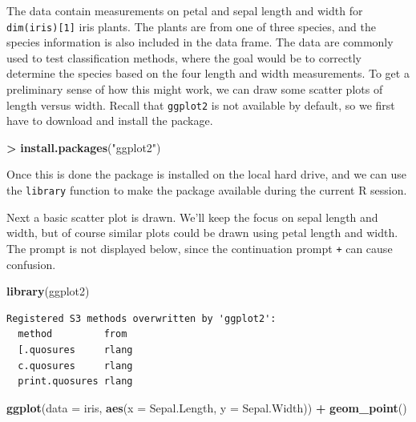 \documentclass[]{krantz}
\makeatletter
\newenvironment{Shaded}{\begin{snugshade}}{\end{snugshade}}
\newcommand{\DataTypeTok}[1]{\textcolor[rgb]{0.27,0.27,0.27}{#1}}
\newcommand{\KeywordTok}[1]{\textcolor[rgb]{0.27,0.27,0.27}{\textbf{#1}}}
\newcommand{\NormalTok}[1]{#1}
\newcommand{\OperatorTok}[1]{\textcolor[rgb]{0.43,0.43,0.43}{\textbf{#1}}}
\newcommand{\StringTok}[1]{\textcolor[rgb]{0.5,0.5,0.5}{#1}}
\newenvironment{kframe}{%
\medskip{}
\setlength{\fboxsep}{.8em}
 \def\at@end@of@kframe{}%
 \ifinner\ifhmode%
  \def\at@end@of@kframe{\end{minipage}}%
  \begin{minipage}{\columnwidth}%
 \fi\fi%
 \def\FrameCommand##1{\hskip\@totalleftmargin \hskip-\fboxsep
 \colorbox{shadecolor}{##1}\hskip-\fboxsep
     \hskip-\linewidth \hskip-\@totalleftmargin \hskip\columnwidth}%
 \MakeFramed {\advance\hsize-\width
   \@totalleftmargin\z@ \linewidth\hsize
   \@setminipage}}%
 {\par\unskip\endMakeFramed%
 \at@end@of@kframe}
\renewenvironment{Shaded}{\begin{kframe}}{\end{kframe}}
\makeatother
\begin{document}
The data contain measurements on petal and sepal length and width for \texttt{dim(iris){[}1{]}} iris plants. The plants are from one of three species, and the species information is also included in the data frame. The data are commonly used to test classification methods, where the goal would be to correctly determine the species based on the four length and width measurements. To get a preliminary sense of how this might work, we can draw some scatter plots of length versus width. Recall that \texttt{ggplot2} is not available by default, so we first have to download and install the package.

\begin{Shaded}
\begin{Highlighting}[]
\OperatorTok{>}\StringTok{ }\KeywordTok{install.packages}\NormalTok{(}\StringTok{"ggplot2"}\NormalTok{)}
\end{Highlighting}
\end{Shaded}

Once this is done the package is installed on the local hard drive, and we can use the \texttt{library} function to make the package available during the current R session.

Next a basic scatter plot is drawn. We'll keep the focus on sepal length and width, but of course similar plots could be drawn using petal length and width. The prompt is not displayed below, since the continuation prompt \texttt{+} can cause confusion.

\begin{Shaded}
\begin{Highlighting}[]
\KeywordTok{library}\NormalTok{(ggplot2)}
\end{Highlighting}
\end{Shaded}

\begin{verbatim}
Registered S3 methods overwritten by 'ggplot2':
  method         from 
  [.quosures     rlang
  c.quosures     rlang
  print.quosures rlang
\end{verbatim}

\begin{Shaded}
\begin{Highlighting}[]
\KeywordTok{ggplot}\NormalTok{(}\DataTypeTok{data =}\NormalTok{ iris, }\KeywordTok{aes}\NormalTok{(}\DataTypeTok{x =}\NormalTok{ Sepal.Length, }\DataTypeTok{y =}\NormalTok{ Sepal.Width)) }\OperatorTok{+}\StringTok{ }
\StringTok{    }\KeywordTok{geom_point}\NormalTok{()}
\end{Highlighting}
\end{Shaded}
\end{document}
